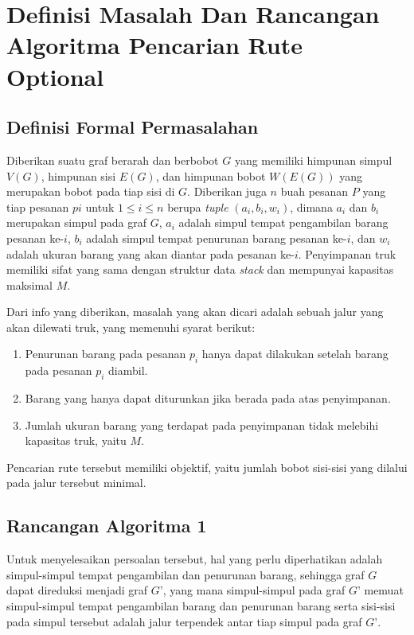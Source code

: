 \chapter{Definisi Masalah Dan Rancangan Algoritma Pencarian Rute Optional}

\section{Definisi Formal Permasalahan}

Diberikan suatu graf berarah dan berbobot $G$ yang memiliki himpunan simpul $V(G)$, himpunan sisi $E(G)$, dan himpunan bobot $W(E(G))$ yang merupakan 
bobot pada tiap sisi di $G$. Diberikan juga $n$ buah pesanan $P$ yang tiap pesanan $pi$ untuk $1 \leq i \leq n$ berupa \textit{tuple} $(a_{i}, b_{i}, w_{i})$, 
dimana $a_{i}$ dan $b_{i}$ merupakan simpul pada graf $G$, $a_{i}$ adalah simpul tempat pengambilan barang pesanan ke-$i$, $b_{i}$ adalah simpul tempat penurunan 
barang pesanan ke-$i$, dan $w_{i}$ adalah ukuran barang yang akan diantar pada pesanan ke-$i$. Penyimpanan truk memiliki sifat yang sama dengan struktur data \textit{stack} 
dan mempunyai kapasitas maksimal $M$.

Dari info yang diberikan, masalah yang akan dicari adalah sebuah jalur yang akan dilewati truk, yang memenuhi syarat berikut:
\begin{enumerate}
    \item Penurunan barang pada pesanan $p_{i}$ hanya dapat dilakukan setelah barang pada pesanan $p_{i}$ diambil.
    \item Barang yang hanya dapat diturunkan jika berada pada atas penyimpanan.
    \item Jumlah ukuran barang yang terdapat pada penyimpanan tidak melebihi kapasitas truk, yaitu $M$.
\end{enumerate}

Pencarian rute tersebut memiliki objektif, yaitu jumlah bobot sisi-sisi yang dilalui pada jalur tersebut minimal.

\section{Rancangan Algoritma 1}

Untuk menyelesaikan persoalan tersebut, hal yang perlu diperhatikan adalah simpul-simpul tempat pengambilan dan penurunan barang, sehingga graf $G$ 
dapat direduksi menjadi graf $G’$, yang mana simpul-simpul pada graf $G’$ memuat simpul-simpul tempat pengambilan barang dan penurunan barang serta 
sisi-sisi pada simpul tersebut adalah jalur terpendek antar tiap simpul pada graf $G’$.


